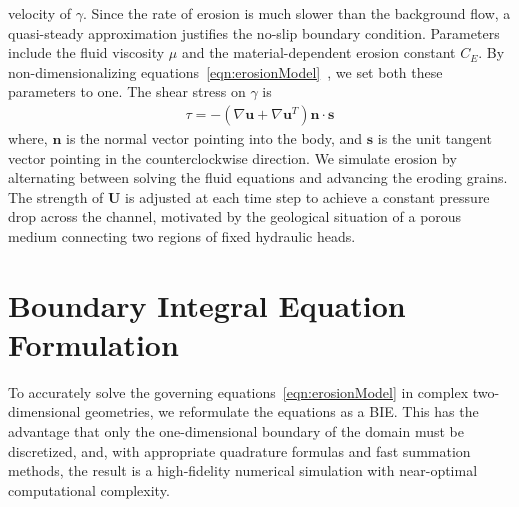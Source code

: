 \documentclass[preprint, superscriptaddress, notitlepage]{revtex4-1}
\newcommand{\nn}{{\mathbf{n}}}
\renewcommand{\ss}{{\mathbf{s}}}
\newcommand{\uu}{{\mathbf{u}}}
\newcommand{\UU}{{\mathbf{U}}}
\newcommand{\CE}{C_E}
\begin{document}
velocity of $\gamma$. Since the rate of erosion is much slower than the
background flow, a quasi-steady approximation justifies the no-slip
boundary condition. Parameters include the fluid viscosity $\mu$ and the
material-dependent erosion constant $\CE$. By non-dimensionalizing
equations~\eqref{eqn:erosionModel}~\citep{qua-moo2018}, we set both
these parameters to one. The shear stress on $\gamma$ is
\begin{align}
  \tau = -(\nabla \uu + \nabla \uu^T) \nn \cdot \ss
  \label{eqn:shearStress}
\end{align}
where, $\nn$ is the normal vector pointing into the body, and $\ss$ is
the unit tangent vector pointing in the counterclockwise direction. We
simulate erosion by alternating between solving the fluid equations and
advancing the eroding grains.  The strength of $\UU$ is adjusted at each
time step to achieve a constant pressure drop across the channel,
motivated by the geological situation of a porous medium connecting two
regions of  fixed hydraulic heads.

\section{Boundary Integral Equation Formulation}
\label{sec:DLP}
To accurately solve the governing equations~\eqref{eqn:erosionModel} in
complex two-dimensional geometries, we reformulate the equations as a
BIE.  This has the advantage that only the one-dimensional boundary of
the domain must be discretized, and, with appropriate quadrature
formulas and fast summation methods, the result is a high-fidelity
numerical simulation with near-optimal computational complexity.

\end{document}
